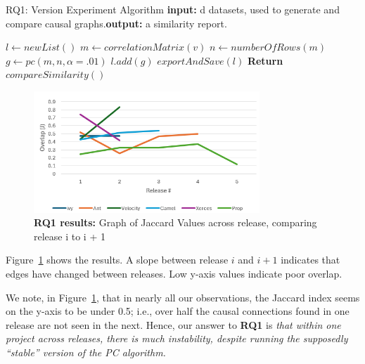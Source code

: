 \documentclass[]{svjour3}
\begin{document}
 

 

\begin{algorithm}[h!tbp]
\footnotesize
	\caption{RQ1: Version Experiment Algorithm \newline\textbf{input: } d  datasets, used to generate and compare causal graphs.\newline \textbf{output: } a similarity report.}\label{alg1}
	\begin{algorithmic}[1]
            \State $l \leftarrow newList()$
				\State $m \leftarrow correlationMatrix(v)$
                \State $n \leftarrow numberOfRows(m)$
                \State $g \leftarrow pc(m, n, \alpha = .01)$
                \State $l.add(g)$
			\EndFor
            \State $exportAndSave(l)$
		\EndFor
    \State \textbf{Return} $compareSimilarity()$
	\end{algorithmic} 
\end{algorithm}

 

\begin{figure}[!b]
\caption{{\bf RQ1 results:} Graph of Jaccard Values across release, comparing release i to i + 1}\label{Version Instability}
\begin{center}
\includegraphics[width=8.5cm]{images/RQ1.png}\end{center}\label{rq1}
\end{figure}

Figure~\ref{rq1} shows the results. A slope between release $i$ and $i+1$ indicates that edges have changed between releases. Low y-axis values indicate poor overlap.

We note, in Figure~\ref{rq1}, that in nearly all our observations, the Jaccard index seems on the y-axis to be under 0.5; i.e., over half the causal connections found in one release are not seen in the next.
Hence, our answer to {\bf RQ1} is {\em that within one project across releases, there is much instability, despite running the supposedly ``stable'' version of the PC algorithm.  }
\end{document}
